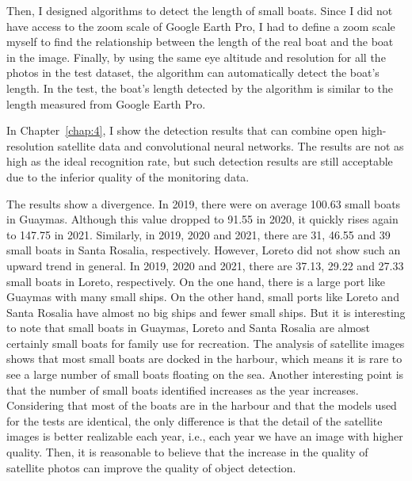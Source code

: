 Then, I designed algorithms to detect the length of small boats. Since I did not have access to the zoom scale of Google Earth Pro, I had to define a zoom scale myself to find the relationship between the length of the real boat and the boat in the image. Finally, by using the same eye altitude and resolution for all the photos in the test dataset, the algorithm can automatically detect the boat's length. In the test, the boat's length detected by the algorithm is similar to the length measured from Google Earth Pro.

In Chapter~\ref{chap:4}, I show the detection results that can combine open high-resolution satellite data and convolutional neural networks. The results are not as high as the ideal recognition rate, but such detection results are still acceptable due to the inferior quality of the monitoring data. 

The results show a divergence. In 2019, there were on average 100.63 small boats in Guaymas. Although this value dropped to 91.55 in 2020, it quickly rises again to 147.75 in 2021. Similarly, in 2019, 2020 and 2021, there are 31, 46.55 and 39 small boats in Santa Rosalia, respectively. However, Loreto did not show such an upward trend in general. In 2019, 2020 and 2021, there are 37.13, 29.22 and 27.33 small boats in Loreto, respectively. On the one hand, there is a large port like Guaymas with many small ships. On the other hand, small ports like Loreto and Santa Rosalia have almost no big ships and fewer small ships. But it is interesting to note that small boats in Guaymas, Loreto and Santa Rosalia are almost certainly small boats for family use for recreation. The analysis of satellite images shows that most small boats are docked in the harbour, which means it is rare to see a large number of small boats floating on the sea. Another interesting point is that the number of small boats identified increases as the year increases. Considering that most of the boats are in the harbour and that the models used for the tests are identical, the only difference is that the detail of the satellite images is better realizable each year, i.e., each year we have an image with higher quality. Then, it is reasonable to believe that the increase in the quality of satellite photos can improve the quality of object detection.



 
